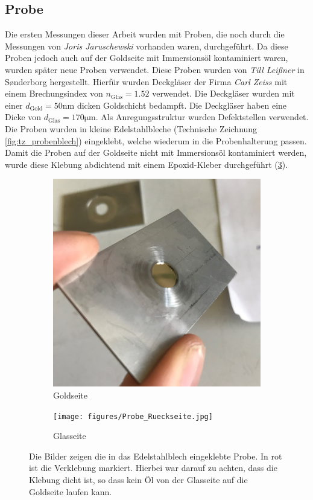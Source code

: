 \documentclass[titlepage,  ngerman]{article}
\begin{document}
	\subsection{Probe}
	Die ersten Messungen dieser Arbeit wurden mit Proben, die noch durch die Messungen von \textit{Joris Jaruschewski} \cite{Jaruschewski.2020} vorhanden waren, durchgeführt. Da diese Proben jedoch auch auf der Goldseite mit Immersionsöl kontaminiert waren, wurden später neue Proben verwendet. Diese Proben wurden von \textit{Till Leißner} in S\o nderborg hergestellt. Hierfür wurden Deckgläser der Firma \textit{Carl Zeiss} mit einem Brechungsindex von $n_{\mathrm{Glas}}= 1.52$ verwendet. Die Deckgläser wurden mit einer $d_{\mathrm{Gold}} = 50\mathrm{nm}$ dicken Goldschicht bedampft. Die Deckgläser haben eine Dicke von $d_{\mathrm{Glas}} = 170 \mathrm{\mu m}$. Als Anregungsstruktur wurden Defektstellen verwendet. Die Proben wurden in kleine Edelstahlbleche (Technische Zeichnung \ref{fig:tz_probenblech}) eingeklebt, welche wiederum in die Probenhalterung passen. Damit die Proben auf der Goldseite nicht mit Immersionsöl kontaminiert werden, wurde diese Klebung abdichtend mit einem Epoxid-Kleber durchgeführt (\ref{fig:probe}).
	\begin{figure}[h]
		\centering
		\begin{subfigure}{0.4\textwidth}
			\centering
			\includegraphics[width=\textwidth]{figures/Probe_Vorderseite.jpg}
			\caption{Goldseite}
			\label{fig:probe_vorderseite}
		\end{subfigure}
		\hfill
		\begin{subfigure}{0.4\textwidth}
			\centering
			\texttt{[image: figures/Probe\_Rueckseite.jpg]}
			\caption{Glasseite}
			\label{fig:probe_rueckseite}
		\end{subfigure}
		\caption[Eingeklebte Probe]{Die Bilder zeigen die in das Edelstahlblech eingeklebte Probe. In rot ist die Verklebung markiert. Hierbei war darauf zu achten, dass die Klebung dicht ist, so dass kein Öl von der Glasseite auf die Goldseite laufen kann.}
		\label{fig:probe}
	\end{figure}
\end{document}
